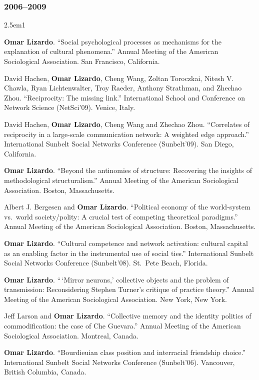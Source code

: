 \documentclass[
]{article}
\newenvironment{cventry}{\begin{hangparas}{2.5em}{1}}{\end{hangparas}}
\begin{document}
\subsubsection{2006--2009}\label{section-29}

\begin{cventry}

\textbf{Omar Lizardo}. ``Social psychological processes as mechanisms
for the explanation of cultural phenomena.'' Annual Meeting of the
American Sociological Association. San Francisco, California.

David Hachen, \textbf{Omar Lizardo}, Cheng Wang, Zoltan Toroczkai,
Nitesh V. Chawla, Ryan Lichtenwalter, Troy Raeder, Anthony Strathman,
and Zhechao Zhou. ``Reciprocity: The missing link.'' International
School and Conference on Network Science (NetSci'09). Venice, Italy.

David Hachen, \textbf{Omar Lizardo}, Cheng Wang and Zhechao Zhou.
``Correlates of reciprocity in a large-scale communication network: A
weighted edge approach.'' International Sunbelt Social Networks
Conference (Sunbelt'09). San Diego, California.

\textbf{Omar Lizardo}. ``Beyond the antinomies of structure: Recovering
the insights of methodological structuralism.'' Annual Meeting of the
American Sociological Association. Boston, Massachusetts.

Albert J. Bergesen and \textbf{Omar Lizardo}. ``Political economy of the
world-system vs.~world society/polity: A crucial test of competing
theoretical paradigms.'' Annual Meeting of the American Sociological
Association. Boston, Massachusetts.

\textbf{Omar Lizardo}. ``Cultural competence and network activation:
cultural capital as an enabling factor in the instrumental use of social
ties.'' International Sunbelt Social Networks Conference (Sunbelt'08).
St.~Pete Beach, Florida.

\textbf{Omar Lizardo}. ``\,`Mirror neurons,' collective objects and the
problem of transmission: Reconsidering Stephen Turner's critique of
practice theory.'' Annual Meeting of the American Sociological
Association. New York, New York.

Jeff Larson and \textbf{Omar Lizardo}. ``Collective memory and the
identity politics of commodification: the case of Che Guevara.'' Annual
Meeting of the American Sociological Association. Montreal, Canada.

\textbf{Omar Lizardo}. ``Bourdieuian class position and interracial
friendship choice.'' International Sunbelt Social Networks Conference
(Sunbelt'06). Vancouver, British Columbia, Canada.

\end{cventry}
\end{document}
